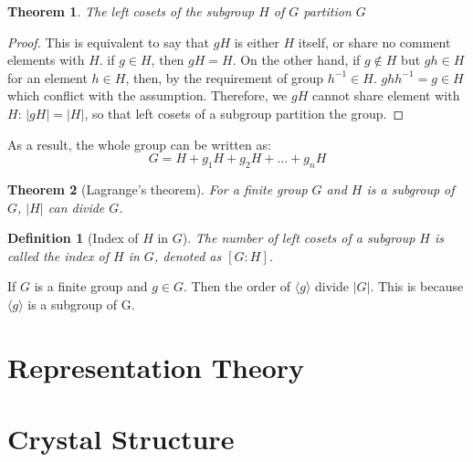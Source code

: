 \documentclass{amsart}
\newtheorem{definition}{Definition}
\newtheorem{theorem}{Theorem}
\begin{document}
\begin{theorem}
    The left cosets of the subgroup $H$ of $G$ partition $G$
\end{theorem}
\begin{proof}
    This is equivalent to say that $gH$ is either $H$ itself, or share no comment elements with $H$.
    if $g\in H$, then $gH = H$. On the other hand, 
    if $g\notin H$ but $gh \in H$ for an element $h\in H$, then, by the requirement of group $h^{-1}\in H$. $ghh^{-1} = g \in H$ which conflict with the assumption.
    Therefore, we $gH$ cannot share element with $H$: $|gH| = |H|$, so that left cosets of a subgroup partition the group.
\end{proof}
As a result, the whole group can be written as:
\[
    G = H + g_1 H + g_2 H + \dots + g_n H    
\]
\begin{theorem}[Lagrange's theorem]
    For a finite group $G$ and $H$ is a subgroup of $G$, $|H|$ can divide $G$.
\end{theorem}
\begin{definition}[Index of $H$ in $G$]
    The number of left cosets of a subgroup $H$ is called the index of $H$ in $G$, denoted as $[G:H]$.
\end{definition}

If $G$ is a finite group and $g\in G$. Then the order of $\langle g\rangle$ divide $|G|$. This is because 
$\langle g\rangle$ is a subgroup of G.

\newpage
\section{Representation Theory}

\newpage
\section{Crystal Structure}
\end{document}
